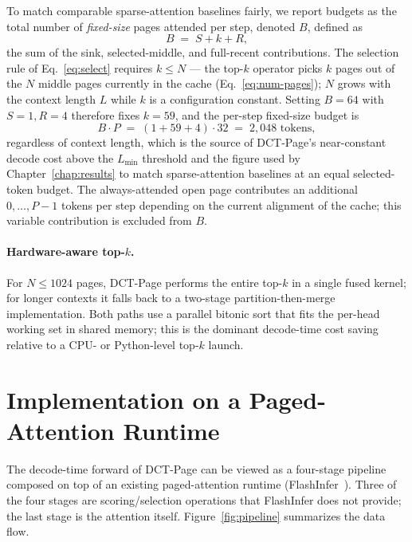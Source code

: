 To match comparable sparse-attention baselines fairly, we report
budgets as the total number of \emph{fixed-size} pages attended per
step, denoted $B$, defined as
\begin{equation}\label{eq:budget}
  B \;=\; S + k + R,
\end{equation}
the sum of the sink, selected-middle, and full-recent contributions.
The selection rule of Eq.~\eqref{eq:select} requires $k \le N$ — the
top-$k$ operator picks $k$ pages out of the $N$ middle pages currently
in the cache (Eq.~\eqref{eq:num-pages}); $N$ grows with the context
length $L$ while $k$ is a configuration constant.  Setting $B{=}64$
with $S{=}1, R{=}4$ therefore fixes $k{=}59$, and the per-step
fixed-size budget is
\begin{equation*}
  B \cdot P
  \;=\; (1 + 59 + 4) \cdot 32
  \;=\; 2{,}048 \text{ tokens},
\end{equation*}
regardless of context length, which is the source of DCT-Page's
near-constant decode cost above the $L_\text{min}$ threshold and the
figure used by Chapter~\ref{chap:results} to match sparse-attention
baselines at an equal selected-token budget.  The always-attended
open page contributes an additional $0,\dots,P{-}1$ tokens per step
depending on the current alignment of the cache; this variable
contribution is excluded from $B$.

\paragraph{Hardware-aware top-$k$.}
For $N \le 1024$ pages, DCT-Page performs the entire top-$k$ in a
single fused kernel; for longer contexts it falls back to a two-stage
partition-then-merge implementation.
Both paths use a parallel bitonic sort that fits the per-head working
set in shared memory; this is the dominant decode-time cost saving
relative to a CPU- or Python-level top-$k$ launch.


\section{Implementation on a Paged-Attention Runtime}\label{sec:kernels}

The decode-time forward of DCT-Page can be viewed as a four-stage
pipeline composed on top of an existing paged-attention runtime
(FlashInfer~\cite{ye2025flashinfer}).
Three of the four stages are scoring/selection operations that
FlashInfer does not provide; the last stage is the attention itself.
Figure~\ref{fig:pipeline} summarizes the data flow.


